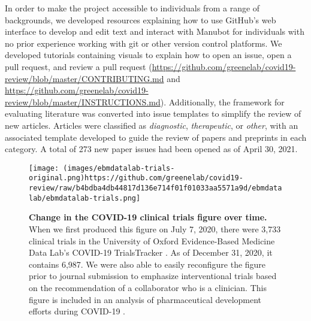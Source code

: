\documentclass[twocolumn]{ceurart}
\begin{document}
In order to make the project accessible to individuals from a range of backgrounds, we developed resources explaining how to use GitHub's web interface to develop and edit text and interact with Manubot for individuals with no prior experience working with git or other version control platforms.
We developed tutorials containing visuals to explain how to open an issue, open a pull request, and review a pull request (\url{https://github.com/greenelab/covid19-review/blob/master/CONTRIBUTING.md} and \url{https://github.com/greenelab/covid19-review/blob/master/INSTRUCTIONS.md}).
Additionally, the framework for evaluating literature was converted into issue templates to simplify the review of new articles.
Articles were classified as \emph{diagnostic}, \emph{therapeutic}, or \emph{other}, with an associated template developed to guide the review of papers and preprints in each category.
A total of 273 new paper issues had been opened as of April 30, 2021.

\begin{figure}
\hypertarget{fig:ebm-trials}{%
\centering
\texttt{[image: (images/ebmdatalab-trials-original.png)https://github.com/greenelab/covid19-review/raw/b4bdba4db44817d136e714f01f01033aa5571a9d/ebmdatalab/ebmdatalab-trials.png]}
\caption{\textbf{Change in the COVID-19 clinical trials figure over time.}
When we first produced this figure on July 7, 2020, there were 3,733 clinical trials in the University of Oxford Evidence-Based Medicine Data Lab's COVID-19 TrialsTracker \citep{SSbnPnzT}.
As of December 31, 2020, it contains 6,987.
We were also able to easily reconfigure the figure prior to journal submission to emphasize interventional trials based on the recommendation of a collaborator who is a clinician.
This figure is included in an analysis of pharmaceutical development efforts during COVID-19 \citep{cifK9B8t}.}\label{fig:ebm-trials}
}
\end{figure}
\end{document}
